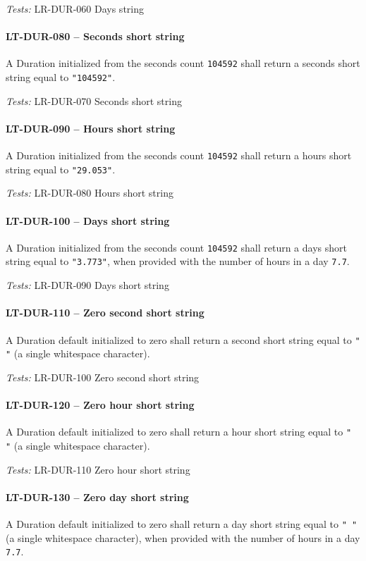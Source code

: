 \textit{Tests: } LR-DUR-060 Days string

\paragraph{LT-DUR-080 -- Seconds short string}
A Duration initialized from the seconds count \lstinline{104592}
shall return a seconds short string equal to \lstinline{"104592"}.

\textit{Tests: } LR-DUR-070 Seconds short string

\paragraph{LT-DUR-090 -- Hours short string}
A Duration initialized from the seconds count \lstinline{104592}
shall return a hours short string equal to \lstinline{"29.053"}.

\textit{Tests: } LR-DUR-080 Hours short string

\paragraph{LT-DUR-100 -- Days short string}
A Duration initialized from the seconds count \lstinline{104592}
shall return a days short string equal to \lstinline{"3.773"},
when provided with the number of hours in a day \lstinline{7.7}.

\textit{Tests: } LR-DUR-090 Days short string

\paragraph{LT-DUR-110 -- Zero second short string}
A Duration default initialized to zero shall return a second short
string equal to \lstinline{" "} (a single whitespace character).

\textit{Tests: } LR-DUR-100 Zero second short string

\paragraph{LT-DUR-120 -- Zero hour short string}
A Duration default initialized to zero shall return a hour short
string equal to \lstinline{" "} (a single whitespace character).

\textit{Tests: } LR-DUR-110 Zero hour short string

\paragraph{LT-DUR-130 -- Zero day short string}
A Duration default initialized to zero shall return a day short
string equal to \lstinline{" "} (a single whitespace character),
when provided with the number of hours in a day \lstinline{7.7}.

